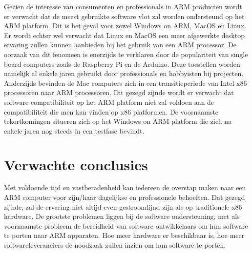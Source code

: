 Gezien de interesse van consumenten en professionals in ARM producten wordt er verwacht dat de meest gebruikte software vlot zal worden ondersteund op het ARM platform. Dit is het geval voor zowel Windows on ARM, MacOS en Linux. Er wordt echter wel verwacht dat Linux en MacOS een meer afgewerkte desktop ervaring zullen kunnen aanbieden bij het gebruik van een ARM processor. De oorzaak van dit fenomeen is enerzijds te verklaren door de populariteit van single board computers zoals de Raspberry Pi en de Arduino. Deze toestellen worden namelijk al enkele jaren gebruikt door professionals en hobbyisten bij projecten. Anderzijds bevinden de Mac computers zich in een transitieperiode van Intel x86 processoren naar ARM processoren. Dit gezegd zijnde wordt er verwacht dat software compatibiliteit op het ARM platform niet zal voldoen aan de compatibiliteit die men kan vinden op x86 platformen. De voornaamste tekortkomingen situeren zich op het Windows on ARM platform die zich na enkele jaren nog steeds in een testfase bevindt.

\section{Verwachte conclusies}
\label{sec:verwachte_conclusies}

Met voldoende tijd en vastberadenheid kan iedereen de overstap maken naar een ARM computer voor zijn/haar dagelijkse en professionele behoeften. Dat gezegd zijnde, zal de ervaring niet altijd even gestroomlijnd zijn als op traditionele x86 hardware. De grootste problemen liggen bij de software ondersteuning, met als voornaamste probleem de bereidheid van software ontwikkelaars om hun software te porten naar ARM apparaten. Hoe meer hardware er beschikbaar is, hoe meer softwareleveranciers de noodzaak zullen inzien om hun software te porten. 

